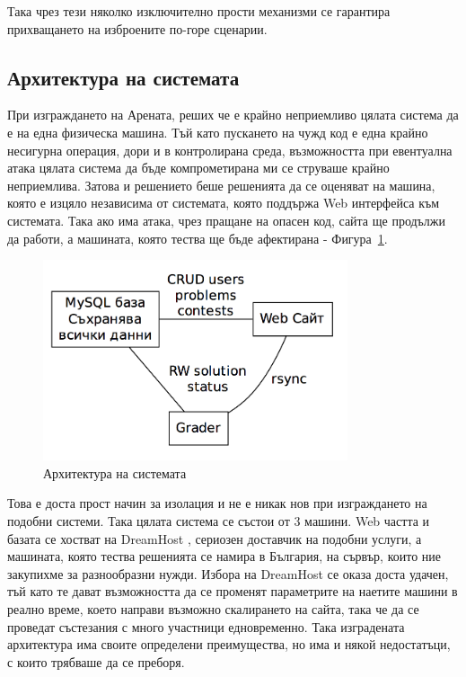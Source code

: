 \documentclass[a4paper,12pt]{article}
\begin{document}
  Така чрез тези няколко изключително прости механизми се гарантира прихващането на изброените по-горе сценарии.
  
  \subsection{Архитектура на системата}
  При изграждането на Арената, реших че е крайно неприемливо цялата система да е на една физическа машина. Тъй като пускането на чужд код е една крайно несигурна операция, дори и в контролирана среда, възможността при евентуална атака цялата система да бъде компрометирана ми се струваше крайно неприемлива. Затова и решението беше решенията да се оценяват на машина, която е изцяло независима от системата, която поддържа Web интерфейса към системата. Така ако има атака, чрез пращане на опасен код, сайта ще продължи да работи, а машината, която тества ще бъде афектирана - Фигура~\ref{architecture}.
  
  \begin{figure}
    \begin{center}
      \includegraphics[width=0.8\textwidth]{images/architecture.png}
    \end{center}
    \caption{Архитектура на системата}
    \label{architecture}
  \end{figure}
  
  Това е доста прост начин за изолация и не е никак нов при изграждането на подобни системи. Така цялата система се състои от 3 машини. Web частта и базата се хостват на DreamHost \cite{dreamhost}, сериозен доставчик на подобни услуги, а машината, която тества решенията се намира в България, на сървър, които ние закупихме за разнообразни нужди. Избора на DreamHost се оказа доста удачен, тъй като те дават възможността да се променят параметрите на наетите машини в реално време, което направи възможно скалирането на сайта, така че да се проведат състезания с много участници едновременно. Така изградената архитектура има своите определени преимущества, но има и някой недостатъци, с които трябваше да се преборя.
  
\end{document}
